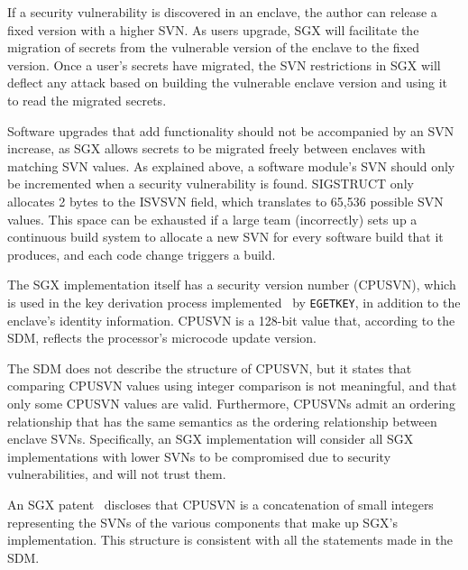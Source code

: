 If a security vulnerability is discovered in an enclave, the author can release
a fixed version with a higher SVN. As users upgrade, SGX will facilitate the
migration of secrets from the vulnerable version of the enclave to the fixed
version. Once a user's secrets have migrated, the SVN restrictions in SGX will
deflect any attack based on building the vulnerable enclave version and using
it to read the migrated secrets.

Software upgrades that add functionality should not be accompanied by an SVN
increase, as SGX allows secrets to be migrated freely between enclaves with
matching SVN values. As explained above, a software module's SVN should only be
incremented when a security vulnerability is found. SIGSTRUCT only allocates
2 bytes to the ISVSVN field, which translates to 65,536 possible SVN values.
This space can be exhausted if a large team (incorrectly) sets up a continuous
build system to allocate a new SVN for every software build that it produces,
and each code change triggers a build.


\label{sec:sgx_cpusvn}


The SGX implementation itself has a security version number (CPUSVN), which is
used in the key derivation process implemented~\cite{intel2013patent1} by
\texttt{EGETKEY}, in addition to the enclave's identity information. CPUSVN is
a 128-bit value that, according to the SDM, reflects the processor's microcode
update version.


The SDM does not describe the structure of CPUSVN, but it states that comparing
CPUSVN values using integer comparison is not meaningful, and that only some
CPUSVN values are valid. Furthermore, CPUSVNs admit an ordering relationship
that has the same semantics as the ordering relationship between enclave SVNs.
Specifically, an SGX implementation will consider all SGX implementations with
lower SVNs to be compromised due to security vulnerabilities, and will not
trust them.

An SGX patent~\cite{intel2013patent1} discloses that CPUSVN is a concatenation
of small integers representing the SVNs of the various components that make up
SGX's implementation. This structure is consistent with all the statements made
in the SDM.


\label{sec:sgx_einit_sigstruct}

